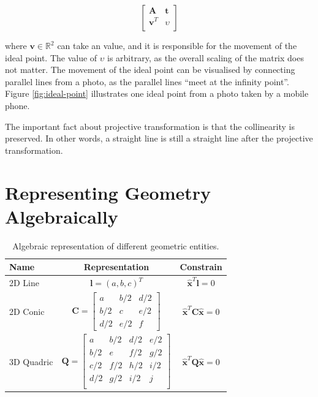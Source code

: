 \documentclass[11pt,twoside]{report}
\begin{document}
$$
\begin{bmatrix}
	\mathbf{A} & \mathbf{t}\\
	\mathbf{v}^T & \upsilon\\
\end{bmatrix}
$$

\noindent where $\mathbf{v} \in \mathbb{R}^2$ can take an value, and it is responsible for the movement of the ideal point. The value of $\upsilon$ is arbitrary, as the overall scaling of the matrix does not matter. The movement of the ideal point can be visualised by connecting parallel lines from a photo, as the parallel lines ``meet at the infinity point''. Figure \ref{fig:ideal-point} illustrates one ideal point from a photo taken by a mobile phone.


The important fact about projective transformation is that the collinearity is preserved. In other words, a straight line is still a straight line after the projective transformation.

\section{Representing Geometry Algebraically}


\begin{table}
	\begin{minipage}[b]{\linewidth}
	\centering
	\begin{tabular}{ l c c }
		\toprule
		Name & Representation & Constrain\\
		\midrule
		2D Line & 
		$ \mathbf{l} = (a, b, c)^T$ &
		$\hat{\mathbf{x}}^T \mathbf{l} = 0$ \\
		2D Conic &
		\parbox{5cm}{
			$$
			\mathbf{C} =
			\begin{bmatrix}
			a & b/2 & d/2\\
			b/2 & c & e/2\\
			d/2 & e/2 & f
			\end{bmatrix}
			$$
		} &
		$ \hat{\mathbf{x}}^T \mathbf{C} \hat{\mathbf{x}} = 0$
		\\
		3D Quadric &
		\parbox{5cm}{
			$$
			\mathbf{Q} =
			\begin{bmatrix}
			a & b/2 & d/2 & e/2\\
			b/2 & e & f/2 & g/2\\
			c/2 & f/2 & h/2 & i/2\\
			d/2 & g/2 & i/2 & j\\
			\end{bmatrix}
			$$
		} &
		$ \hat{\mathbf{x}}^T \mathbf{Q} \hat{\mathbf{x}} = 0$
		\\
	\bottomrule
	\end{tabular}
	\end{minipage}
	
	\caption{Algebraic representation of different geometric entities.}
  \label{table:geometry}
\end{table}
\end{document}

